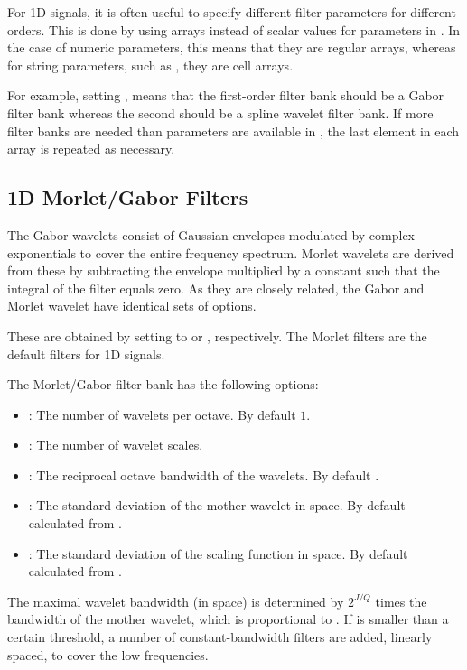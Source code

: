 \documentclass{article}
\begin{document}
For 1D signals, it is often useful to specify different filter parameters for different orders. This is done by using arrays instead of scalar values for parameters in . In the case of numeric parameters, this means that they are regular arrays, whereas for string parameters, such as , they are cell arrays.

For example, setting , means that the first-order filter bank should be a Gabor filter bank whereas the second should be a spline wavelet filter bank. If more filter banks are needed than parameters are available in , the last element in each array is repeated as necessary.

\subsection{1D Morlet/Gabor Filters}
The Gabor wavelets consist of Gaussian envelopes modulated by complex exponentials to cover the entire frequency spectrum. Morlet wavelets are derived from these by subtracting the envelope multiplied by a constant such that the integral of the filter equals zero. As they are closely related, the Gabor and Morlet wavelet have identical sets of options.

These are obtained by setting  to  or , respectively. The Morlet filters are the default filters for 1D signals. 

The Morlet/Gabor filter bank has the following options:
\begin{itemize}
	\item {}: The number of wavelets per octave. By default $1$.
	\item {}: The number of wavelet scales.
	\item {}: The reciprocal octave bandwidth of the wavelets. By default .
	\item {}: The standard deviation of the mother wavelet in space. By default calculated from .
	\item {}: The standard deviation of the scaling function in space. By default calculated from .
\end{itemize}
The maximal wavelet bandwidth (in space) is determined by $2^{J/Q}$ times the bandwidth of the mother wavelet, which is proportional to . If  is smaller than a certain threshold, a number of constant-bandwidth filters are added, linearly spaced, to cover the low frequencies.
\end{document}

